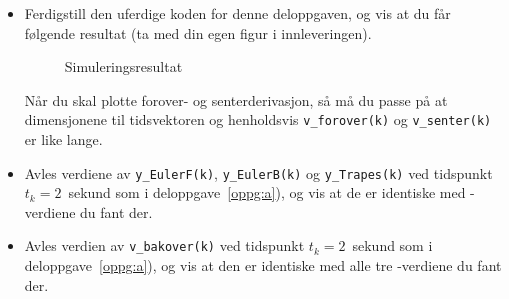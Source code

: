   \begin{itemize}
  \item Ferdigstill den uferdige koden for denne deloppgaven, og
    vis at du får følgende resultat (ta med din egen figur
    i innleveringen).
    \begin{figure}[H]
      \centering
      \hspace*{10mm}
      \caption{Simuleringsresultat }
      \label{fig:fig3b_1}
    \end{figure}


  Når du skal plotte forover- og senterderivasjon,
  så må du passe på at dimensjonene til tidsvektoren og henholdsvis
  {\tt  v\_forover(k)} og  {\tt v\_senter(k)} er like lange. 
  
\item
  Avles verdiene av  {\tt y\_EulerF(k)},  {\tt y\_EulerB(k)} og
  {\tt y\_Trapes(k)} ved tidspunkt $t_{k}{=}2$~sekund som i
  deloppgave~\ref{oppg:a}), og vis at de er identiske med
  {\color{blue}}-verdiene du fant der.

\item
  Avles verdien av  {\tt v\_bakover(k)} 
  ved tidspunkt $t_{k}{=}2$~sekund som i
  deloppgave~\ref{oppg:a}), og vis at den er identiske med
 alle tre {\color{red}}-verdiene du fant der. 
  \end{itemize}

